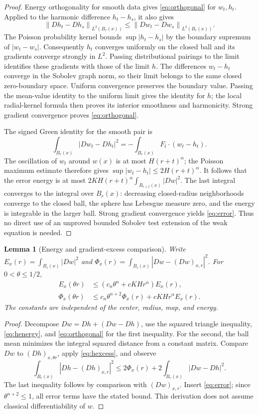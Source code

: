 \documentclass[11pt,a4paper]{article}
\numberwithin{equation}{section}
\newtheorem{lemma}[theorem]{Lemma}
\theoremstyle{definition}
\theoremstyle{remark}
\newcommand{\norm}[1]{\left\lVert#1\right\rVert}
\begin{document}
\begin{proof}
Energy orthogonality for smooth data gives \eqref{eq:orthogonal} for
\(w_t,h_t\). Applied to the harmonic difference \(h_t-h_s\), it also gives
\[
 \norm{Dh_t-Dh_s}_{L^2(B_r(x))}
 \le\norm{Dw_t-Dw_s}_{L^2(B_r(x))}.
\]
The Poisson probability kernel bounds
\(\sup|h_t-h_s|\) by the boundary supremum of \(|w_t-w_s|\).
Consequently \(h_t\) converges uniformly on the closed ball and its
gradients converge strongly in \(L^2\). Passing distributional pairings
to the limit identifies these gradients with those of the limit \(h\).
The differences \(w_t-h_t\) converge in the Sobolev graph norm, so their
limit belongs to the same closed zero-boundary space. Uniform convergence
preserves the boundary value. Passing the mean-value identity to the
uniform limit gives the identity for \(h\); the local radial-kernel formula
then proves its interior smoothness and harmonicity. Strong gradient
convergence proves \eqref{eq:orthogonal}.

The signed Green identity for the smooth pair is
\[
 \int_{B_r(x)}|Dw_t-Dh_t|^2
 =-\int_{B_r(x)}F_t\cdot(w_t-h_t).
\]
The oscillation of \(w_t\) around \(w(x)\) is at most
\(H(r+t)^\alpha\); the Poisson maximum estimate therefore gives
\(\sup|w_t-h_t|\le2H(r+t)^\alpha\). It follows that the error energy is
at most
\(2KH(r+t)^\alpha\int_{B_{r+t}(x)}|Dw|^2\).
The last integral converges to the integral over \(B_r(x)\): decreasing
closed-radius neighborhoods converge to the closed ball, the sphere has
Lebesgue measure zero, and the energy is integrable in the larger ball.
Strong gradient convergence yields \eqref{eq:error}. Thus no direct use of
an unproved bounded Sobolev test extension of the weak equation is needed.
\end{proof}

\begin{lemma}[Energy and gradient-excess comparison]
\label{lem:comparisons}
Write \(E_x(r)=\int_{B_r(x)}|Dw|^2\) and
\(\Phi_x(r)=\int_{B_r(x)}|Dw-(Dw)_{x,r}|^2\). For
\(0<\theta\le1/2\),
\begin{align}
 E_x(\theta r)&\le(c_n\theta^n+cKHr^\alpha)E_x(r),
 \label{eq:energycomparison}\\
 \Phi_x(\theta r)&\le c_n\theta^{n+2}\Phi_x(r)
                  +cKHr^\alpha E_x(r).
 \label{eq:excesscomparison}
\end{align}
The constants are independent of the center, radius, map, and energy.
\end{lemma}
\begin{proof}
Decompose \(Dw=Dh+(Dw-Dh)\), use the squared triangle inequality,
\eqref{eq:henergy}, and \eqref{eq:orthogonal} for the first inequality.
For the second, the ball mean minimizes the integral squared distance
from a constant matrix. Compare \(Dw\) to \((Dh)_{x,\theta r}\), apply
\eqref{eq:hexcess}, and observe
\[
 \int_{B_r(x)}|Dh-(Dh)_{x,r}|^2
 \le2\Phi_x(r)+2\int_{B_r(x)}|Dw-Dh|^2.
\]
The last inequality follows by comparison with \((Dw)_{x,r}\).
Insert \eqref{eq:error}; since \(\theta^{n+2}\le1\), all error terms
have the stated bound. This derivation does not assume classical
differentiability of \(w\).
\end{proof}
\end{document}
